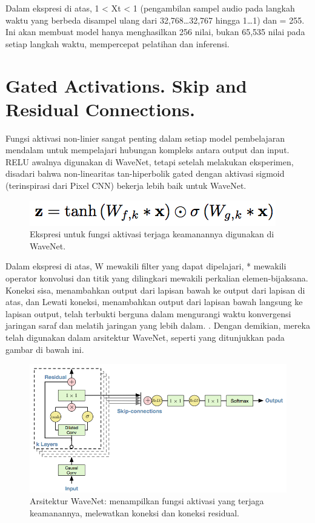 Dalam ekspresi di atas, 1 < Xt < 1 (pengambilan sampel audio pada langkah waktu yang berbeda disampel ulang dari 32,768…32,767 hingga 1…1) dan = 255. Ini akan membuat model hanya menghasilkan 256 nilai, bukan 65,535 nilai pada setiap langkah waktu, mempercepat pelatihan dan inferensi.

\section{Gated Activations. Skip and Residual Connections.}
Fungsi aktivasi non-linier sangat penting dalam setiap model pembelajaran mendalam untuk mempelajari hubungan kompleks antara output dan input. RELU awalnya digunakan di WaveNet, tetapi setelah melakukan eksperimen, disadari bahwa non-linearitas tan-hiperbolik gated dengan aktivasi sigmoid (terinspirasi dari Pixel CNN) bekerja lebih baik untuk WaveNet.
\begin{figure}[H]
        \centerline{\includegraphics[scale=.5]{figures/rumus5}}
        \caption{Ekspresi untuk fungsi aktivasi terjaga keamanannya digunakan di WaveNet.}
		\label{rumus5}
\end{figure}
Dalam ekspresi di atas, W mewakili filter yang dapat dipelajari, * mewakili operator konvolusi dan titik yang dilingkari mewakili perkalian elemen-bijaksana. Koneksi sisa, menambahkan output dari lapisan bawah ke output dari lapisan di atas, dan Lewati koneksi, menambahkan output dari lapisan bawah langsung ke lapisan output, telah terbukti berguna dalam mengurangi waktu konvergensi jaringan saraf dan melatih jaringan yang lebih dalam. . Dengan demikian, mereka telah digunakan dalam arsitektur WaveNet, seperti yang ditunjukkan pada gambar di bawah ini.
\begin{figure}[H]
        \centerline{\includegraphics[scale=.35]{figures/rumus6}}
        \caption{Arsitektur WaveNet: menampilkan fungsi aktivasi yang terjaga keamanannya, melewatkan koneksi dan koneksi residual.}
		\label{rumus6}
\end{figure}


